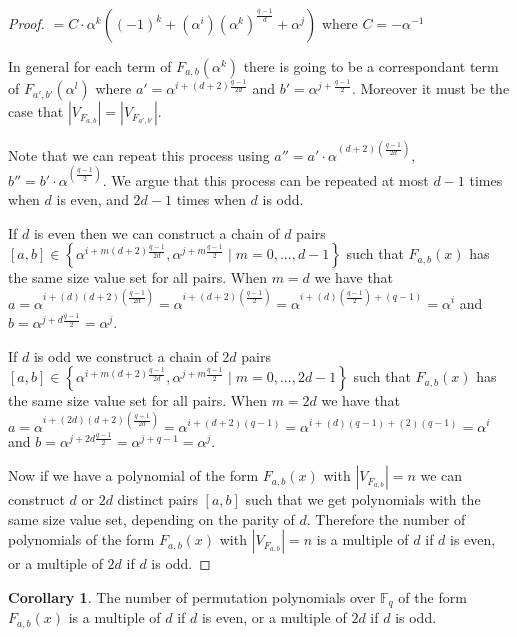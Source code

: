 \documentclass{article}
\theoremstyle{definition}
\newtheorem{corollary}[theorem]{Corollary}
\theoremstyle{remark}
\numberwithin{equation}{section}
\begin{document}
\begin{proof}
      $= C \cdot \alpha^{k}((-1)^{k}+(\alpha^{i})(\alpha^{k})^{\frac{q-1}{d}}+\alpha^{j})$ where $C=-\alpha^{-1}$

      In general for each term of $F_{a,b}(\alpha^{k})$ there is going to be a correspondant term of $F_{a',b'}(\alpha^{l})$ where $a' = \alpha^{i+(d+2)\frac{q-1}{2d}}$ and $b'= \alpha^{j + \frac{q-1}{2}}$. Moreover it must be the case that $\left\vert V_{F_{a,b}} \right\vert = \left\vert V_{F_{a',b'}} \right\vert$.

      Note that we can repeat this process using $a'' = a' \cdot \alpha^{(d+2)(\frac{q-1}{2d})}$, $b'' = b' \cdot \alpha^{(\frac{q-1}{2})}$. We argue that this process can be repeated at most $d-1$ times when $d$ is even, and $2d-1$ times when $d$ is odd.

      If $d$ is even then we can construct a chain of $d$ pairs $[a,b] \in \left\{ \alpha^{i+m (d+2) \frac{q-1}{2d}}, \alpha^{j+m \frac{q-1}{2}} \mid m=0,...,d-1 \right\}$ such that $F_{a,b}(x)$ has the same size value set for all pairs. When $m=d$ we have that $a = \alpha^{i+(d)(d+2)(\frac{q-1}{2d})} = \alpha^{i+(d+2)(\frac{q-1}{2})} = \alpha^{i+(d)(\frac{q-1}{2})+(q-1)} = \alpha^i$ and $b = \alpha^{j+d \frac{q-1}{2}} = \alpha^j$.

      If $d$ is odd we construct a chain of $2d$ pairs $[a,b] \in \left\{ \alpha^{i+m (d+2) \frac{q-1}{2d}}, \alpha^{j+m \frac{q-1}{2}} \mid m=0,...,2d-1 \right\}$ such that $F_{a,b}(x)$ has the same size value set for all pairs. When $m=2d$ we have that $a = \alpha^{i+(2d)(d+2)(\frac{q-1}{2d})} = \alpha^{i+(d+2)(q-1)} = \alpha^{i+(d)(q-1)+(2)(q-1)} = \alpha^i$ and $b = \alpha^{j+2d \frac{q-1}{2}} = \alpha^{j+q-1} = \alpha^j$.

      Now if we have a polynomial of the form $F_{a,b}(x)$ with $\left\vert V_{F_{a,b}} \right\vert = n$ we can construct $d$ or $2d$ distinct pairs $[a,b]$ such that we get polynomials with the same size value set, depending on the parity of $d$. Therefore the number of polynomials of the form $F_{a,b}(x)$ with $\left\vert V_{F_{a,b}} \right\vert = n$ is a multiple of $d$ if $d$ is even, or a multiple of $2d$ if $d$ is odd.
    \end{proof}

    \begin{corollary}
          The number of permutation polynomials  over $\mathbb{F}_{q}$ of the form $F_{a,b}(x)$ is a multiple of $d$ if $d$ is even, or a multiple of $2d$ if $d$ is odd.
    \end{corollary}
\end{document}
